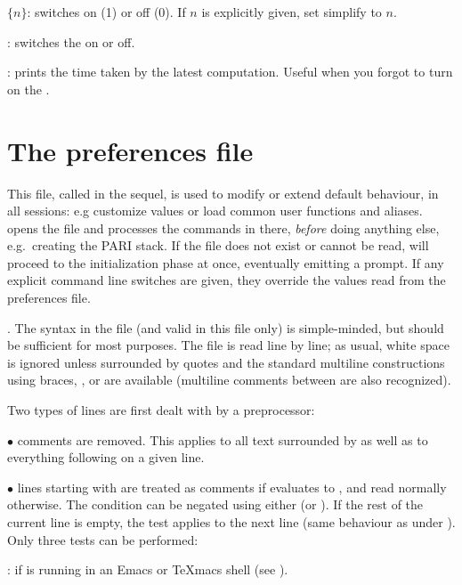  $\{n\}$: switches  on (1) or off (0). If $n$
is explicitly given, set simplify to $n$.

\subseckbd{\#}: switches the  on or off.

\subseckbd{\#\#}: prints the time taken by the latest computation.
Useful when you forgot to turn on the .


\section{The preferences file}
\label{se:gprc}

This file, called  in the sequel, is used to modify or extend
default behaviour, in all  sessions: e.g customize  values or
load common user functions and aliases.  opens the  file and
processes the commands in there, \emph{before} doing anything else,
e.g.~creating the PARI stack. If the file does not exist or cannot be read,
 will proceed to the initialization phase at once, eventually emitting a
prompt. If any explicit command line switches are given, they override the
values read from the preferences file.

. The syntax in the  file (and valid in this file
only) is simple-minded, but should be sufficient for most purposes. The file
is read line by line; as usual, white space is ignored unless surrounded by
quotes and the standard multiline constructions using braces, \kbd{\bs}, or
\kbd{=} are available (multiline comments between \kbd{/*~\dots~*/} are also
recognized).

Two types of lines are first dealt with by a preprocessor:

$\bullet$ comments are removed. This applies to all text surrounded by
\kbd{/*~\dots~*/} as well as to everything following \kbd{\bs\bs} on a given
line.

$\bullet$ lines starting with   are treated as
comments if  evaluates to , and read normally
otherwise. The condition can be negated using either  (or
). If the rest of the current line is empty, the test applies to
the next line (same behaviour as \kbd{=} under ). Only three tests can be
performed:

:  if  is running in an Emacs or TeXmacs shell (see
).

